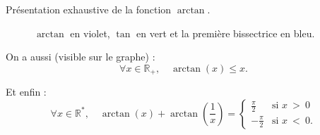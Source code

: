 \documentclass{article}
\renewenvironment{question_kholle}[2][ ]
{
	\subsection{\texorpdfstring{#2}{}}
	\notblank{#1}
	{
		\noindent #1
		\bigbreak
	}
	{}
	\begin{proof}
}
{
	\end{proof}
}
\begin{document}
\begin{question_kholle}{Présentation exhaustive de la fonction $\arctan$.}
\begin{figure}[H]
		\caption{$\arctan$ en violet, $\tan$ en vert et la première bissectrice en bleu.}
	\end{figure}
	On a aussi (visible sur le graphe) :
	\[
		\forall x \in \mathbb{R}_+, \quad \arctan(x) \leq x.
	\]

	Et enfin : %
	\[
		\forall x \in \mathbb{R}^*, \quad \arctan(x) + \arctan \left( \frac{1}{x} \right) =
		\left\{ \begin{array}{cl}
			\frac{\pi}{2}  & \text{si } x \ > \ 0  \\
			-\frac{\pi}{2} & \text{si } x \ < \ 0.
		\end{array} \right.
	\]

\end{question_kholle}
\end{document}
